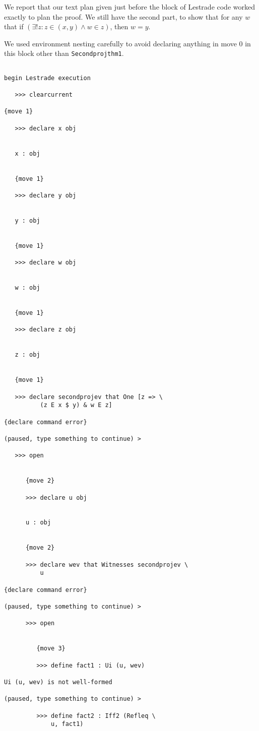 \documentclass[12pt]{article}
\begin{document}
We report that our text plan given just before the block of Lestrade code worked exactly to plan the proof.  We still have the second part, to show that for any $w$ that if $(\exists! z: z \in (x,y) \wedge w \in z)$, then $w=y$.

We used environment nesting carefully to avoid declaring anything in move 0 in this block other than {\tt Secondprojthm1}.

\begin{verbatim}

begin Lestrade execution

   >>> clearcurrent

{move 1}

   >>> declare x obj


   x : obj


   {move 1}

   >>> declare y obj


   y : obj


   {move 1}

   >>> declare w obj


   w : obj


   {move 1}

   >>> declare z obj


   z : obj


   {move 1}

   >>> declare secondprojev that One [z => \
          (z E x $ y) & w E z]

{declare command error}

(paused, type something to continue) >

   >>> open


      {move 2}

      >>> declare u obj


      u : obj


      {move 2}

      >>> declare wev that Witnesses secondprojev \
          u

{declare command error}

(paused, type something to continue) >

      >>> open


         {move 3}

         >>> define fact1 : Ui (u, wev)

Ui (u, wev) is not well-formed

(paused, type something to continue) >

         >>> define fact2 : Iff2 (Refleq \
             u, fact1)


\end{verbatim}
\end{document}
